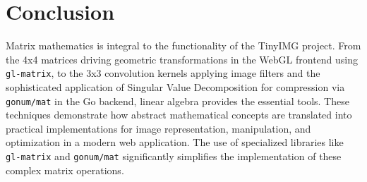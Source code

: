 \documentclass{article}
\begin{document}
\section{Conclusion}

Matrix mathematics is integral to the functionality of the TinyIMG project. From the 4x4 matrices driving geometric transformations in the WebGL frontend using \texttt{gl-matrix}, to the 3x3 convolution kernels applying image filters and the sophisticated application of Singular Value Decomposition for compression via \texttt{gonum/mat} in the Go backend, linear algebra provides the essential tools. These techniques demonstrate how abstract mathematical concepts are translated into practical implementations for image representation, manipulation, and optimization in a modern web application. The use of specialized libraries like \texttt{gl-matrix} and \texttt{gonum/mat} significantly simplifies the implementation of these complex matrix operations.
\end{document}
